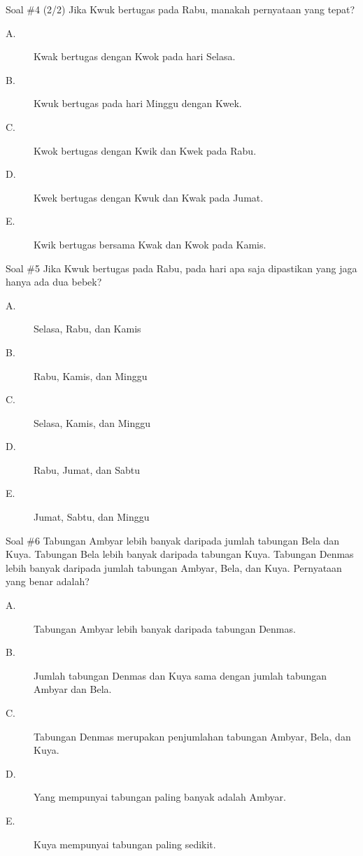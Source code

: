 \documentclass[english,t]{beamer}
\begin{document}
	\begin{frame}{Soal \#4 (2/2)}
		Jika Kwuk bertugas pada Rabu, manakah pernyataan yang tepat?	
		\begin{description}
			\item[A.] Kwak bertugas dengan Kwok pada hari Selasa.
			\item[B.] Kwuk bertugas pada hari Minggu dengan Kwek.
			\item[C.] Kwok bertugas dengan Kwik dan Kwek pada Rabu.
			\item[D.] Kwek bertugas dengan Kwuk dan Kwak pada Jumat.
			\item[E.] Kwik bertugas bersama Kwak dan Kwok pada Kamis.
		\end{description}		
	\end{frame}

	\begin{frame}{Soal \#5}
		Jika Kwuk bertugas pada Rabu, pada hari apa saja dipastikan yang jaga hanya ada dua bebek?
		\begin{description}
			\item[A.] Selasa, Rabu, dan Kamis
			\item[B.] Rabu, Kamis, dan Minggu
			\item[C.] Selasa, Kamis, dan Minggu
			\item[D.] Rabu, Jumat, dan Sabtu
			\item[E.] Jumat, Sabtu, dan Minggu
		\end{description}		
	\end{frame}

	\begin{frame}{Soal \#6}
		Tabungan Ambyar lebih banyak daripada jumlah tabungan Bela dan Kuya. Tabungan Bela lebih banyak daripada tabungan Kuya. Tabungan Denmas lebih banyak daripada jumlah tabungan Ambyar, Bela, dan Kuya. Pernyataan yang benar adalah?
		\begin{description}
			\item[A.] Tabungan Ambyar lebih banyak daripada tabungan Denmas.
			\item[B.] Jumlah tabungan Denmas dan Kuya sama dengan jumlah tabungan Ambyar dan Bela.
			\item[C.] Tabungan Denmas merupakan penjumlahan tabungan Ambyar, Bela, dan Kuya.
			\item[D.] Yang mempunyai tabungan paling banyak adalah Ambyar.
			\item[E.] Kuya mempunyai tabungan paling sedikit.
		\end{description}			
	\end{frame}
\end{document}
